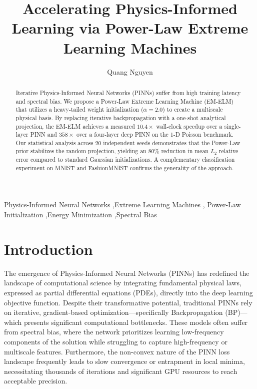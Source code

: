 \documentclass[final,12pt,3p,times,fleqn]{elsarticle}
\begin{document}
\begin{frontmatter}

\title{Accelerating Physics-Informed Learning via Power-Law Extreme Learning Machines}

\author[1,2]{Quang Nguyen}

\address[1]{Department of Physics, International University, Ho Chi Minh City, Vietnam}
\address[2]{Viet Nam National University Ho Chi Minh City, Vietnam}


\begin{abstract}
Iterative Physics-Informed Neural Networks (PINNs) suffer from high training latency and spectral bias. We propose a Power-Law Extreme Learning Machine (EM-ELM) that utilizes a heavy-tailed weight initialization ($\alpha=2.0$) to create a multiscale physical basis. By replacing iterative backpropagation with a one-shot analytical projection, the EM-ELM achieves a measured $10.4\times$ wall-clock speedup over a single-layer PINN and $358\times$ over a four-layer deep PINN on the 1-D Poisson benchmark. Our statistical analysis across 20 independent seeds demonstrates that the Power-Law prior stabilizes the random projection, yielding an $80\%$ reduction in mean $L_2$ relative error compared to standard Gaussian initializations. A complementary classification experiment on MNIST and FashionMNIST confirms the generality of the approach.
\end{abstract}

\begin{keyword}
Physics-Informed Neural Networks \sep Extreme Learning Machines \sep
Power-Law Initialization \sep Energy Minimization \sep Spectral Bias
\end{keyword}

\end{frontmatter}

\section{Introduction}

The emergence of Physics-Informed Neural Networks (PINNs) has redefined the landscape of computational science by integrating fundamental physical laws, expressed as partial differential equations (PDEs), directly into the deep learning objective function. Despite their transformative potential, traditional PINNs rely on iterative, gradient-based optimization---specifically Backpropagation (BP)---which presents significant computational bottlenecks. These models often suffer from spectral bias, where the network prioritizes learning low-frequency components of the solution while struggling to capture high-frequency or multiscale features. Furthermore, the non-convex nature of the PINN loss landscape frequently leads to slow convergence or entrapment in local minima, necessitating thousands of iterations and significant GPU resources to reach acceptable precision.
\end{document}
